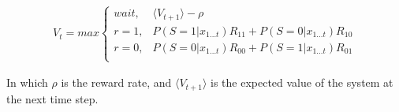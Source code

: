\documentclass[12pt]{article}
\begin{document}
\begin{align}
V_t = max
\begin{cases}
wait, & \langle V_{t+1} \rangle -\rho\\
r=1, & P(S=1 | x_{1 \dots t})R_{11} + P(S=0|x_{1 \dots t})R_{10}\\
r=0, & P(S=0 | x_{1 \dots t})R_{00} + P(S=1 | x_{1 \dots t})R_{01}\\
\end{cases}
\end{align}

In which $\rho$ is the reward rate, and $\langle V_{t+1} \rangle$ is the expected value of the system at the next time step.  
\end{document}
